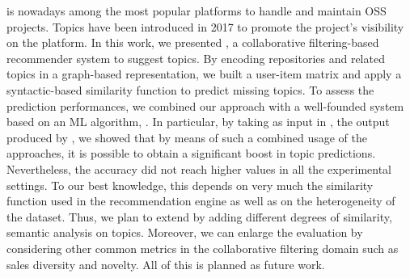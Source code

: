 \GH is nowadays among the most popular platforms to handle and maintain OSS projects. 
Topics have been introduced in 2017 to promote the project's visibility on the 
platform. 
In this work, we presented \TF, a collaborative filtering-based recommender 
system to suggest \GH topics.  By encoding repositories and related topics in a 
graph-based representation, we built a user-item matrix and apply a 
syntactic-based similarity function to predict missing topics.
To assess the prediction performances, we combined our approach with a well-founded system based on an ML algorithm, \ie \MNB. In particular, by taking as input in \TF, the 
output produced by \MNB, we showed that by means of such a combined usage of the approaches, it is possible to obtain a significant boost in topic predictions. 
Nevertheless, the accuracy did not reach higher values in all the experimental 
settings. To our best knowledge, this depends on very much the similarity function used in 
the recommendation engine as well as on the heterogeneity of the dataset. Thus, 
we plan to extend \TF by adding different degrees of similarity, \eg 
semantic analysis on topics. Moreover, we can enlarge the evaluation by 
considering other common metrics in the collaborative filtering domain such as 
sales diversity and novelty. All of this is planned as future work.
